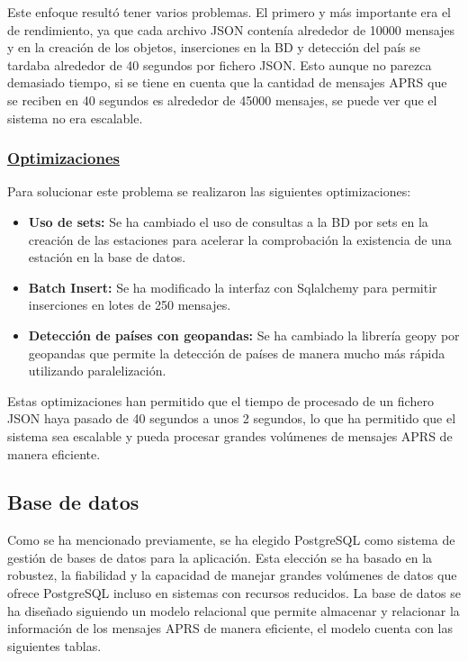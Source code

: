 Este enfoque resultó tener varios problemas. El primero y más importante era el de rendimiento, ya que cada archivo JSON contenía alrededor de 10000 mensajes y en la creación de los objetos, inserciones en la BD y detección del país se tardaba alrededor de 40 segundos por fichero JSON. Esto aunque no parezca demasiado tiempo, si se tiene en cuenta que la cantidad de mensajes APRS que se reciben en 40 segundos es alrededor de 45000 mensajes, se puede ver que el sistema no era escalable.

\subsubsection{\underline{Optimizaciones}}
Para solucionar este problema se realizaron las siguientes optimizaciones:
\begin{itemize}
	\item \textbf{Uso de sets:} Se ha cambiado el uso de consultas a la BD por sets en la creación de las estaciones para acelerar la comprobación la existencia de una estación en la base de datos.
	\item \textbf{Batch Insert:} Se ha modificado la interfaz con Sqlalchemy para permitir inserciones en lotes de 250 mensajes.
	\item \textbf{Detección de países con geopandas:} Se ha cambiado la librería geopy por geopandas que permite la detección de países de manera mucho más rápida utilizando paralelización.
\end{itemize}
Estas optimizaciones han permitido que el tiempo de procesado de un fichero JSON haya pasado de 40 segundos a unos 2 segundos, lo que ha permitido que el sistema sea escalable y pueda procesar grandes volúmenes de mensajes APRS de manera eficiente.

\subsection{Base de datos}
Como se ha mencionado previamente, se ha elegido PostgreSQL como sistema de gestión de bases de datos para la aplicación. Esta elección se ha basado en la robustez, la fiabilidad y la capacidad de manejar grandes volúmenes de datos que ofrece PostgreSQL incluso en sistemas con recursos reducidos. La base de datos se ha diseñado siguiendo un modelo relacional  que permite almacenar y relacionar la información de los mensajes APRS de manera eficiente, el modelo cuenta con las siguientes tablas.

